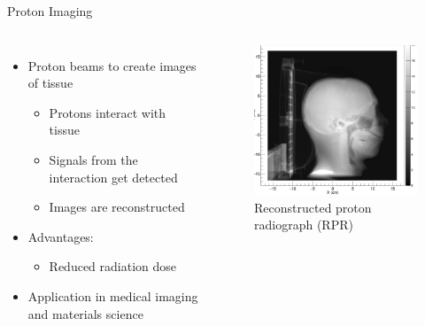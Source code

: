 \begin{frame}{\huge{Proton Imaging}}
  \begin{columns}
    \begin{itemize}
      \setlength\itemsep{1em}
      \item Proton beams to create images of tissue
        \begin{itemize}
          \item[\rightarrow] Protons interact with tissue
          \item[\rightarrow] Signals from the interaction get detected
          \item[\rightarrow] Images are reconstructed
        \end{itemize}
        \item Advantages:
        \begin{itemize}
          \item[\rightarrow] Reduced radiation dose
        \end{itemize}
        \item Application in medical imaging and materials science
      \end{itemize}
        \begin{figure}
          \centering
          \label{fig:rpr}
          \includegraphics[width=.9\textwidth]{figures/pi.png}
          \caption*{Reconstructed proton radiograph (RPR) \cite[p.~99]{pi}}
        \end{figure}
    \end{columns}
\end{frame}
